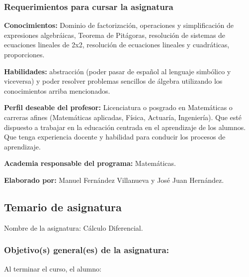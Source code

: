 \documentclass[12pt]{article}
\begin{document}
\subsubsection{Requerimientos para cursar la
asignatura}\label{requerimientos-para-cursar-la-asignatura}

\textbf{Conocimientos:} Dominio de factorización, operaciones y
simplificación de expresiones algebráicas, Teorema de Pitágoras,
resolución de sistemas de ecuaciones lineales de 2x2, resolución de
ecuaciones lineales y cuadráticas, proporciones.

\textbf{Habilidades:} abstracción (poder pasar de español al lenguaje
simbólico y viceversa) y poder resolver problemas sencillos de álgebra
utilizando los conocimientos arriba mencionados.

\textbf{Perfil deseable del profesor:} Licenciatura o posgrado en
Matemáticas o carreras afines (Matemáticas aplicadas, Física, Actuaría,
Ingeniería). Que esté dispuesto a trabajar en la educación centrada en
el aprendizaje de los alumnos. Que tenga experiencia docente y habilidad
para conducir los procesos de aprendizaje.

\textbf{Academia responsable del programa:} Matemáticas.

\textbf{Elaborado por: } Manuel Fernández Villanueva y José Juan
Hernández.

\subsection{Temario de asignatura}\label{temario-de-asignatura}

Nombre de la asignatura: Cálculo Diferencial.

\subsubsection{Objetivo(s) general(es) de la
asignatura:}\label{objetivos-generales-de-la-asignatura}

Al terminar el curso, el alumno:
\end{document}

